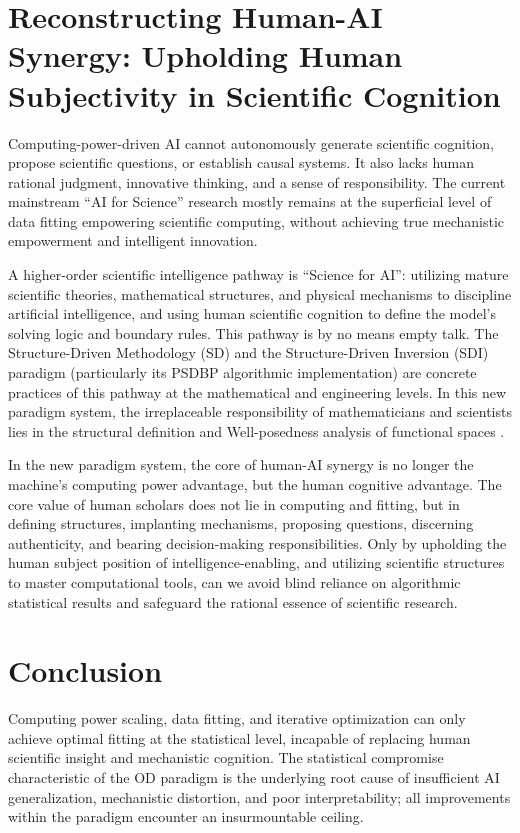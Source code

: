 \documentclass[11pt,a4paper]{article}
\begin{document}
\section{Reconstructing Human-AI Synergy: Upholding Human Subjectivity in Scientific Cognition}
Computing-power-driven AI cannot autonomously generate scientific cognition, propose scientific questions, or establish causal systems. It also lacks human rational judgment, innovative thinking, and a sense of responsibility. The current mainstream ``AI for Science'' research mostly remains at the superficial level of data fitting empowering scientific computing, without achieving true mechanistic empowerment and intelligent innovation.

A higher-order scientific intelligence pathway is ``Science for AI'': utilizing mature scientific theories, mathematical structures, and physical mechanisms to discipline artificial intelligence, and using human scientific cognition to define the model's solving logic and boundary rules. This pathway is by no means empty talk. The Structure-Driven Methodology (SD) \cite{chen2026sd} and the Structure-Driven Inversion (SDI) paradigm \cite{chen2026sdi} (particularly its PSDBP algorithmic implementation) are concrete practices of this pathway at the mathematical and engineering levels. In this new paradigm system, the irreplaceable responsibility of mathematicians and scientists lies in the structural definition and Well-posedness analysis of functional spaces \cite{tikhonov1977}.

In the new paradigm system, the core of human-AI synergy is no longer the machine's computing power advantage, but the human cognitive advantage. The core value of human scholars does not lie in computing and fitting, but in defining structures, implanting mechanisms, proposing questions, discerning authenticity, and bearing decision-making responsibilities. Only by upholding the human subject position of intelligence-enabling, and utilizing scientific structures to master computational tools, can we avoid blind reliance on algorithmic statistical results and safeguard the rational essence of scientific research.

\section{Conclusion}
Computing power scaling, data fitting, and iterative optimization can only achieve optimal fitting at the statistical level, incapable of replacing human scientific insight and mechanistic cognition. The statistical compromise characteristic of the OD paradigm is the underlying root cause of insufficient AI generalization, mechanistic distortion, and poor interpretability; all improvements within the paradigm encounter an insurmountable ceiling.
\end{document}
